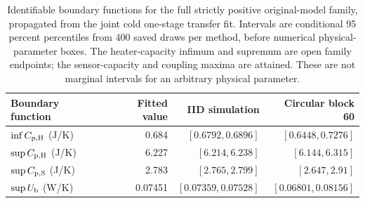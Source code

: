 \begin{table}[tbp]
\centering
\small
\begin{tabular}{lrrr}
\toprule
Boundary function & Fitted value & IID simulation & Circular block 60 \\
\midrule
$\inf C_{\mathrm{p,H}}$ (J/K) & 0.684 & $[0.6792,0.6896]$ & $[0.6448,0.7276]$ \\
$\sup C_{\mathrm{p,H}}$ (J/K) & 6.227 & $[6.214,6.238]$ & $[6.144,6.315]$ \\
$\sup C_{\mathrm{p,S}}$ (J/K) & 2.783 & $[2.765,2.799]$ & $[2.647,2.91]$ \\
$\sup U_{\mathrm b}$ (W/K) & 0.07451 & $[0.07359,0.07528]$ & $[0.06801,0.08156]$ \\
\bottomrule
\end{tabular}
\caption{Identifiable boundary functions for the full strictly positive original-model family, propagated from the joint cold one-stage transfer fit. Intervals are conditional 95 percent percentiles from 400 saved draws per method, before numerical physical-parameter boxes. The heater-capacity infimum and supremum are open family endpoints; the sensor-capacity and coupling maxima are attained. These are not marginal intervals for an arbitrary physical parameter.}
\label{tab:family-limits}
\end{table}
